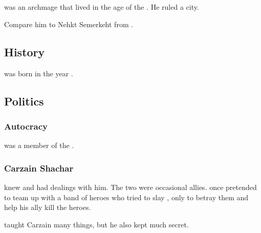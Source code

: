\section{\ZeethanKraal}
\index{\ZeethanKraal}
\ZeethanKraal was an \ophidian archmage that lived in the age of the \thirdbanewar. 
He ruled a city. 

Compare him to Nehkt Semerkeht from \cite{RobertEHoward:NehktSemerkeht}. 









\subsection{History}
\ZeethanKraal was born in the year .









\subsection{Politics}





\subsubsection{\Caisith Autocracy}
\Kraal was a member of the . 





\subsubsection{Carzain Shachar}

 knew \ZeethanKraal and had dealings with him. 
The two were occasional allies.
\Shachar once pretended to team up with a band of heroes who tried to slay \Kraal, only to betray them and help his ally \Kraal kill the heroes.

\Kraal taught Carzain many things, but he also kept much secret. 






























